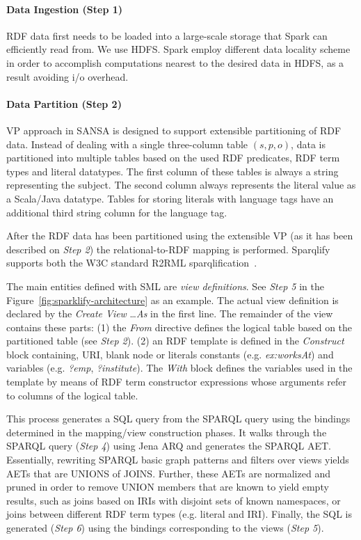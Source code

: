 \paragraph{Data Ingestion (Step 1)} \gls{RDF} data first needs to be loaded into a large-scale storage that Spark can efficiently read from.
We use \gls{HDFS}.
Spark employ different data locality scheme in order to accomplish computations nearest to the desired data in \gls{HDFS}, as a result avoiding i/o overhead. 
\paragraph{Data Partition (Step 2)}
VP approach in SANSA is designed to support extensible partitioning of \gls{RDF} data.
Instead of dealing with a single three-column table $(s, p, o)$, data is partitioned into multiple tables based on the used \gls{RDF} predicates, \gls{RDF} term types and literal datatypes.
The first column of these tables is always a string representing the subject.
The second column always represents the literal value as a Scala/Java datatype.
Tables for storing literals with language tags have an additional third string column for the language tag.

After the \gls{RDF} data has been partitioned using the extensible VP (as it has been described on \textit{Step 2}) the relational-to-RDF mapping is performed. 
Sparqlify supports both the \gls{W3C} standard R2RML
sparqlification~\cite{sml}.

The main entities defined with SML are \textit{view definitions}.
See \textit{Step 5} in the Figure~\ref{fig:sparklify-architecture} as an example.
The actual view definition is declared by the \emph{Create View} \ldots \emph{As} in the first line.
The remainder of the view contains these parts: (1) the \emph{From} directive defines the logical table based on the partitioned table (see \textit{Step 2}).
(2) an RDF template is defined in the \emph{Construct} block containing, \gls{URI}, blank node or literals constants (e.g. \emph{ex:worksAt}) and variables (e.g. \emph{?emp}, \emph{?institute}).
The \emph{With} block defines the variables used in the template by means of \gls{RDF} term constructor expressions whose arguments refer to columns of the logical table.

This process generates a SQL query from the \gls{SPARQL} query using the bindings determined in the mapping/view construction phases.
It walks through the \gls{SPARQL} query (\textit{Step 4}) using Jena ARQ and generates the \gls{SPARQL} \gls{AET}. 
Essentially, rewriting \gls{SPARQL} basic graph patterns and filters over views yields \gls{AET}s that are UNIONS of JOINS.
Further, these AETs are normalized and pruned in order to remove UNION members that are known to yield empty results, such as joins based on \gls{IRI}s with disjoint sets of known namespaces, or joins between different \gls{RDF} term types (e.g. literal and \gls{IRI}).
Finally, the SQL is generated (\textit{Step 6}) using the bindings corresponding to the views (\textit{Step 5}).

